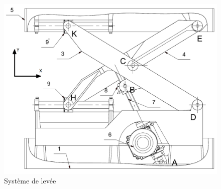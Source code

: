 \begin{figure}[htbp]
\begin{center}
\includegraphics[width=\linewidth]{img/face.png}
\caption{Système de levée}
\label{fig:image7}
\end{center}
\end{figure}

